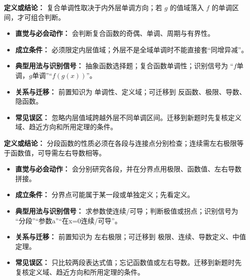\begin{knowledgeBox}
\textbf{定义或结论：} 复合单调性取决于内外层单调方向；若 $g$ 的值域落入 $f$ 的单调区间，才可组合判断。

\begin{itemize}
  \item \textbf{直觉与必会动作：} 会判断复合函数的奇偶、单调、周期与有界性。
  \item \textbf{成立条件：} 必须限定内层值域；外层不是全域单调时不能直接套“同增异减”。
  \item \textbf{典型用法与识别信号：} 抽象函数选择题；复合函数单调性；识别信号为 “$f$单调，$g$单调”“$f(g(x))$”。
  \item \textbf{关系与迁移：} 前置知识为 单调性、定义域；可迁移到 反函数、极限、导数、隐函数。
  \item \textbf{常见误区：} 忽略内层值域跨越外层不同单调区间。迁移到新题时先复核定义域、趋近方向和所用定理的条件。
\end{itemize}
\end{knowledgeBox}

\begin{knowledgeBox}
\textbf{定义或结论：} 分段函数的性质必须在各段与连接点分别检查；连续需左右极限等于函数值，可导需左右导数相等。

\begin{itemize}
  \item \textbf{直觉与必会动作：} 会分别研究各段，并在分界点用极限、函数值、左右导数拼接。
  \item \textbf{成立条件：} 分界点可能属于某一段或单独定义；先看定义。
  \item \textbf{典型用法与识别信号：} 求参数使连续/可导；判断极值或拐点；识别信号为 “分段”“参数a”“在x=0连续/可导”。
  \item \textbf{关系与迁移：} 前置知识为 左右极限；可迁移到 极限、连续、导数定义、中值定理。
  \item \textbf{常见误区：} 只比较两段表达式值；忘记函数值或左右导数。迁移到新题时先复核定义域、趋近方向和所用定理的条件。
\end{itemize}
\end{knowledgeBox}

